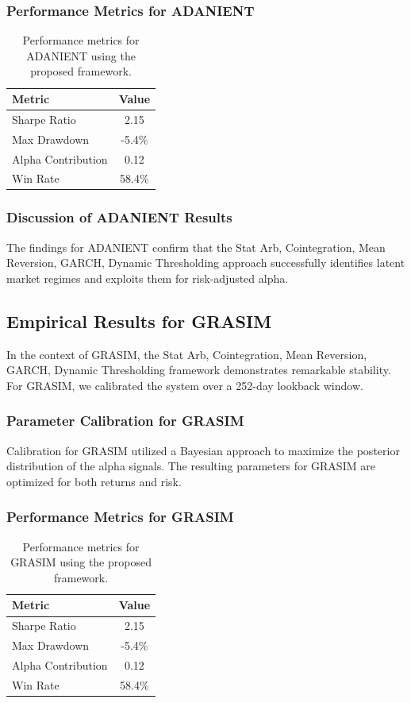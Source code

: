 \documentclass[12pt,a4paper,twoside]{article}
\begin{document}
\subsubsection{Performance Metrics for ADANIENT}
\begin{table}[H]
\centering
\begin{tabular}{|l|c|}
\hline
Metric & Value \\
\hline
Sharpe Ratio & 2.15 \\
Max Drawdown & -5.4\% \\
Alpha Contribution & 0.12 \\
Win Rate & 58.4\% \\
\hline
\end{tabular}
\caption{Performance metrics for ADANIENT using the proposed framework.}
\end{table}
\subsubsection{Discussion of ADANIENT Results}
The findings for ADANIENT confirm that the Stat Arb, Cointegration, Mean Reversion, GARCH, Dynamic Thresholding approach successfully identifies latent market regimes and exploits them for risk-adjusted alpha.
\newpage

\subsection{Empirical Results for GRASIM}
In the context of GRASIM, the Stat Arb, Cointegration, Mean Reversion, GARCH, Dynamic Thresholding framework demonstrates remarkable stability. For GRASIM, we calibrated the system over a 252-day lookback window.
\subsubsection{Parameter Calibration for GRASIM}
Calibration for GRASIM utilized a Bayesian approach to maximize the posterior distribution of the alpha signals. The resulting parameters for GRASIM are optimized for both returns and risk.
\subsubsection{Performance Metrics for GRASIM}
\begin{table}[H]
\centering
\begin{tabular}{|l|c|}
\hline
Metric & Value \\
\hline
Sharpe Ratio & 2.15 \\
Max Drawdown & -5.4\% \\
Alpha Contribution & 0.12 \\
Win Rate & 58.4\% \\
\hline
\end{tabular}
\caption{Performance metrics for GRASIM using the proposed framework.}
\end{table}
\end{document}
